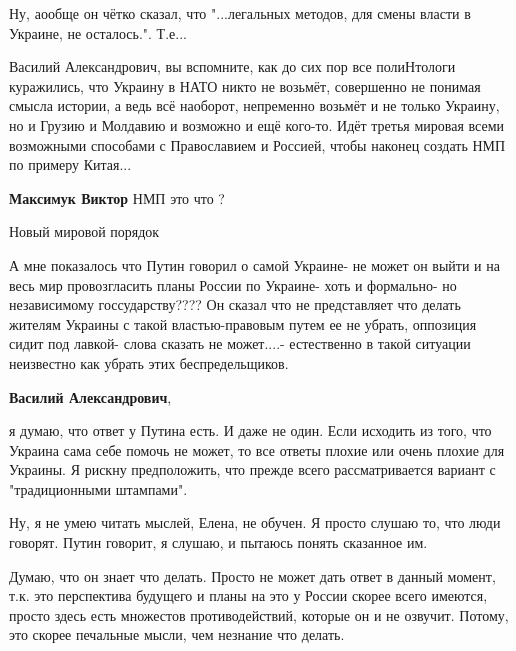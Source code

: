\begin{itemize}

Ну, аообще он чётко сказал, что "...легальных методов, для смены власти в
Украине, не осталось.". Т.е...


Василий Александрович, вы вспомните, как до сих пор все полиНтологи куражились,
что Украину в НАТО никто не возьмёт, совершенно не понимая смысла истории, а
ведь всё наоборот, непременно возьмёт и не только Украину, но и Грузию и
Молдавию и возможно и ещё кого-то. Идёт третья мировая всеми возможными
способами с Православием и Россией, чтобы наконец создать НМП по примеру
Китая...

\begin{itemize} %
\textbf{Максимук Виктор} НМП это что ?

Новый мировой порядок
\end{itemize} %


А мне показалось что Путин говорил о самой Украине- не может он выйти и на весь
мир провозгласить планы России по Украине- хоть и формально- но независимому
госсударству???? Он сказал что не представляет что делать жителям Украины с
такой властью-правовым путем ее не убрать, оппозиция сидит под лавкой- слова
сказать не может....- естественно в такой ситуации неизвестно как убрать этих
беспредельщиков.

\textbf{Василий Александрович}, 

я думаю, что ответ у Путина есть. И даже не один. Если исходить из того, что
Украина сама себе помочь не может, то все ответы плохие или очень плохие для
Украины. Я рискну предположить, что прежде всего рассматривается вариант с
"традиционными штампами".

\begin{itemize} %
Ну, я не умею читать мыслей, Елена, не обучен. Я просто слушаю то, что люди говорят. Путин говорит, я слушаю, и пытаюсь понять сказанное им.
\end{itemize} %


Думаю, что он знает что делать. Просто не может дать ответ в данный момент,
т.к. это перспектива будущего и планы на это у России скорее всего имеются,
просто здесь есть множестов противодействий, которые он и не озвучит. Потому,
это скорее печальные мысли, чем незнание что делать.


\end{itemize}
